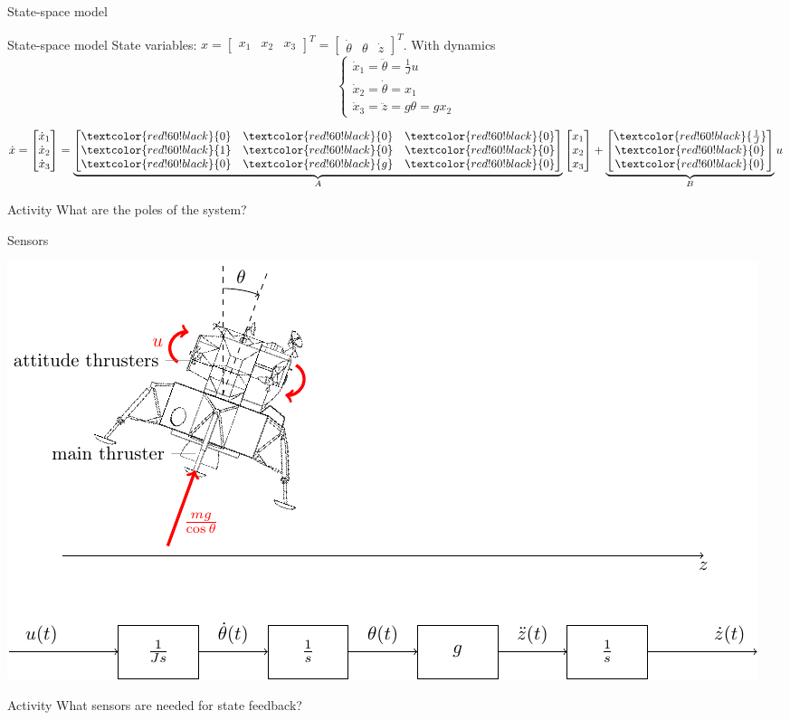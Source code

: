 \documentclass[presentation,aspectratio=169]{beamer}
\begin{document}
\begin{frame}[label={sec:org0597e2b}]{State-space model}
\end{frame}
\begin{frame}[label={sec:org2af19a2}]{State-space model}
State variables: \(x = \begin{bmatrix} x_1 & x_2 & x_3 \end{bmatrix}^T = \begin{bmatrix} \dot{\theta} & \theta & \dot{z} \end{bmatrix}^T\). With dynamics
\[ \begin{cases} \dot{x}_1 =  \ddot{\theta} = \frac{1}{J} u\\ \dot{x}_2 = \dot{\theta} = x_1\\ \dot{x}_3 = \ddot{z} = g\theta = gx_2 \end{cases} \]

\[ \dot{x} = \begin{bmatrix} \dot{x}_1\\\dot{x}_2\\\dot{x}_3\end{bmatrix} = \underbrace{\begin{bmatrix} \textcolor{red!60!black}{0} & \textcolor{red!60!black}{0} &\textcolor{red!60!black}{0} \\\textcolor{red!60!black}{1} & \textcolor{red!60!black}{0}& \textcolor{red!60!black}{0}\\ \textcolor{red!60!black}{0}& \textcolor{red!60!black}{g} &\textcolor{red!60!black}{0} \end{bmatrix}}_{A} \begin{bmatrix} x_1\\x_2\\x_3\end{bmatrix} + \underbrace{\begin{bmatrix} \textcolor{red!60!black}{\frac{1}{J}} \\ \textcolor{red!60!black}{0} \\\textcolor{red!60!black}{0}  \end{bmatrix}}_{B} u \]

\pause

\alert{Activity} What are the poles of the system?
\end{frame}

\begin{frame}[label={sec:org76223fa}]{Sensors}
\begin{center}
\includegraphics[width=0.8\linewidth]{../../figures/fig-apollo}
\end{center}
\alert{Activity} What sensors are needed for state feedback?
\end{frame}
\end{document}
